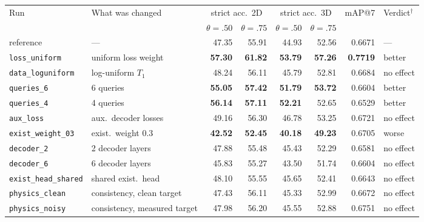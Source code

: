 \begin{tabular}{llrrrrrl}
\toprule
\multirow{2}{*}{Run} & \multirow{2}{*}{What was changed} & \multicolumn{2}{c}{strict acc.\ 2D} & \multicolumn{2}{c}{strict acc.\ 3D} & \multirow{2}{*}{mAP@7} & \multirow{2}{*}{Verdict$^{\dagger}$} \\
\cmidrule(lr){3-4}\cmidrule(lr){5-6}
 & & $\theta{=}.50$ & $\theta{=}.75$ & $\theta{=}.50$ & $\theta{=}.75$ & & \\
\midrule
reference & --- & 47.35 & 55.91 & 44.93 & 52.56 & 0.6671 & --- \\
\midrule
\texttt{loss\_uniform} & uniform loss weight & \textbf{57.30} & \textbf{61.82} & \textbf{53.79} & \textbf{57.26} & \textbf{0.7719} & better \\
\texttt{data\_loguniform} & log-uniform $T_1$ & 48.24 & 56.11 & 45.79 & 52.81 & 0.6684 & no effect \\
\texttt{queries\_6} & 6 queries & \textbf{55.05} & \textbf{57.42} & \textbf{51.79} & \textbf{53.72} & 0.6604 & better \\
\texttt{queries\_4} & 4 queries & \textbf{56.14} & \textbf{57.11} & \textbf{52.21} & 52.65 & 0.6529 & better \\
\texttt{aux\_loss} & aux.\ decoder losses & 49.16 & 56.30 & 46.78 & 53.25 & 0.6721 & no effect \\
\texttt{exist\_weight\_03} & exist.\ weight 0.3 & \textbf{42.52} & \textbf{52.45} & \textbf{40.18} & \textbf{49.23} & 0.6705 & worse \\
\texttt{decoder\_2} & 2 decoder layers & 47.88 & 55.48 & 45.43 & 52.29 & 0.6581 & no effect \\
\texttt{decoder\_6} & 6 decoder layers & 45.83 & 55.27 & 43.50 & 51.74 & 0.6604 & no effect \\
\texttt{exist\_head\_shared} & shared exist.\ head & 48.10 & 55.55 & 45.65 & 52.41 & 0.6643 & no effect \\
\texttt{physics\_clean} & consistency, clean target & 47.43 & 56.11 & 45.33 & 52.99 & 0.6672 & no effect \\
\texttt{physics\_noisy} & consistency, measured target & 47.98 & 56.20 & 45.55 & 52.88 & 0.6751 & no effect \\
\bottomrule
\end{tabular}
